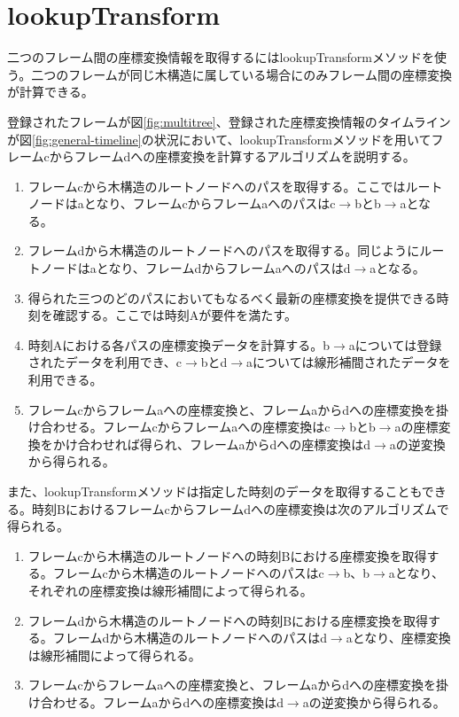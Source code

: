 \documentclass[a4paper]{jreport}	%
\begin{document}
\section{lookupTransform}
二つのフレーム間の座標変換情報を取得するにはlookupTransformメソッドを使う。二つのフレームが同じ木構造に属している場合にのみフレーム間の座標変換が計算できる。

登録されたフレームが図\ref{fig:multitree}、登録された座標変換情報のタイムラインが図\ref{fig:general-timeline}の状況において、lookupTransformメソッドを用いてフレームcからフレームdへの座標変換を計算するアルゴリズムを説明する。

\begin{enumerate}
	\item フレームcから木構造のルートノードへのパスを取得する。ここではルートノードはaとなり、フレームcからフレームaへのパスはc$\rightarrow$bとb$\rightarrow$aとなる。
	\item フレームdから木構造のルートノードへのパスを取得する。同じようにルートノードはaとなり、フレームdからフレームaへのパスはd$\rightarrow$aとなる。
	\item 得られた三つのどのパスにおいてもなるべく最新の座標変換を提供できる時刻を確認する。ここでは時刻Aが要件を満たす。
	\item 時刻Aにおける各パスの座標変換データを計算する。b$\rightarrow$aについては登録されたデータを利用でき、c$\rightarrow$bとd$\rightarrow$aについては線形補間されたデータを利用できる。
	\item フレームcからフレームaへの座標変換と、フレームaからdへの座標変換を掛け合わせる。フレームcからフレームaへの座標変換はc$\rightarrow$bとb$\rightarrow$aの座標変換をかけ合わせれば得られ、フレームaからdへの座標変換はd$\rightarrow$aの逆変換から得られる。
\end{enumerate}
また、lookupTransformメソッドは指定した時刻のデータを取得することもできる。時刻Bにおけるフレームcからフレームdへの座標変換は次のアルゴリズムで得られる。

\begin{enumerate}
	\item フレームcから木構造のルートノードへの時刻Bにおける座標変換を取得する。フレームcから木構造のルートノードへのパスはc$\rightarrow$b、b$\rightarrow$aとなり、それぞれの座標変換は線形補間によって得られる。
	\item フレームdから木構造のルートノードへの時刻Bにおける座標変換を取得する。フレームdから木構造のルートノードへのパスはd$\rightarrow$aとなり、座標変換は線形補間によって得られる。
	\item フレームcからフレームaへの座標変換と、フレームaからdへの座標変換を掛け合わせる。フレームaからdへの座標変換はd$\rightarrow$aの逆変換から得られる。
\end{enumerate}
\end{document}
